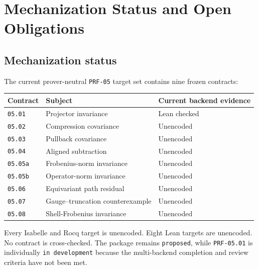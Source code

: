 \chapter{Mechanization Status and Open Obligations}

\label{ch:mechanization-status}



\section{Mechanization status}


The current prover-neutral \texttt{PRF-05} target set contains nine frozen
contracts:

\begin{center}
\small
\begin{tabular}{@{}lll@{}}
\toprule
Contract & Subject & Current backend evidence \\
\midrule
\texttt{05.01} & Projector invariance & Lean checked \\
\texttt{05.02} & Compression covariance & Unencoded \\
\texttt{05.03} & Pullback covariance & Unencoded \\
\texttt{05.04} & Aligned subtraction & Unencoded \\
\texttt{05.05a} & Frobenius-norm invariance & Unencoded \\
\texttt{05.05b} & Operator-norm invariance & Unencoded \\
\texttt{05.06} & Equivariant path residual & Unencoded \\
\texttt{05.07} & Gauge--truncation counterexample & Unencoded \\
\texttt{05.08} & Shell-Frobenius invariance & Unencoded \\
\bottomrule
\end{tabular}
\end{center}

Every Isabelle and Rocq target is unencoded. Eight Lean targets are unencoded.
No contract is cross-checked. The package remains \texttt{proposed}, while
\texttt{PRF-05.01} is individually \texttt{in development} because the
multi-backend completion and review criteria have not been met.

